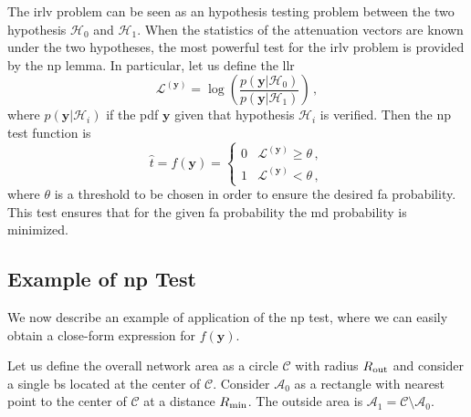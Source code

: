 \documentclass[conference,draftcls,onecolumn]{IEEEtran}
\begin{document}
The \ac{irlv} problem can be seen as an hypothesis testing problem between the two hypothesis $\mathcal H_0$ and $\mathcal H_1$. When the statistics of the attenuation vectors are known under the two hypotheses, the most powerful test for the \ac{irlv} problem is provided by the \ac{np} lemma. In particular, let us  define the \ac{llr}
\begin{equation}\label{eq:lr}
    \mathcal{L}^{(\bm{y})}=\log\left(\frac{p(\bm{y}|\mathcal{H}_0)}{p(\bm{y}|\mathcal{H}_1)}\right)\,,
\end{equation}
where $p(\bm{y}|\mathcal{H}_i)$ if the \ac{pdf} $\bm{y}$ given that hypothesis $\mathcal H_i$ is verified. Then the \ac{np} test function is 
\begin{equation}
\label{eq:thrOpt}
    \hat{t} = f(\bm{y}) = \begin{cases}
    0 & \mathcal{L}^{(\bm{y})} \geq \theta\,, \\ 
    1 & \mathcal{L}^{(\bm{y})} < \theta\,, 
    \end{cases}
\end{equation}
where $\theta$ is a threshold to be chosen in order to ensure the desired \ac{fa} probability. This test ensures that for the given \ac{fa} probability the \ac{md} probability is minimized. 

\subsection{Example of \ac{np} Test}
\label{sec:los}
We now describe an example of application of the \ac{np} test, where we can easily obtain a close-form expression for $f(\bm{y})$. 

Let us define the overall network area as a circle $\mathcal{C}$ with radius $R_{\rm out}$ and consider a single \ac{bs} located at the center of $\mathcal{C}$. Consider $\mathcal{A}_{0}$ as a rectangle with nearest point to the center of $\mathcal{C}$ at a distance $R_{\rm min}$. The outside area is $\mathcal{A}_1 = \mathcal{C} \setminus \mathcal{A}_0$.
\end{document}
